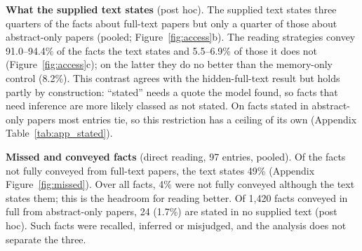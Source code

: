 \documentclass{article} %
\begin{document}
\textbf{What the supplied text states} (post hoc). The supplied text states three quarters of the facts about full-text papers but only a quarter of those about abstract-only papers (pooled; Figure~\ref{fig:access}b). The reading strategies convey 91.0--94.4\% of the facts the text states and 5.5--6.9\% of those it does not (Figure~\ref{fig:access}c); on the latter they do no better than the memory-only control (8.2\%). This contrast agrees with the hidden-full-text result but holds partly by construction: ``stated'' needs a quote the model found, so facts that need inference are more likely classed as not stated. On facts stated in abstract-only papers most entries tie, so this restriction has a ceiling of its own (Appendix Table~\ref{tab:app_stated}).

\textbf{Missed and conveyed facts} (direct reading, 97 entries, pooled). Of the facts not fully conveyed from full-text papers, the text states 49\% (Appendix Figure~\ref{fig:missed}). Over all facts, 4\% were not fully conveyed although the text states them; this is the headroom for reading better. Of 1,420 facts conveyed in full from abstract-only papers, 24 (1.7\%) are stated in no supplied text (post hoc). Such facts were recalled, inferred or misjudged, and the analysis does not separate the three.
\end{document}
